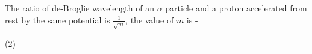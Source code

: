 \item The ratio of de-Broglie wavelength of an $\alpha$ particle and a proton accelerated from rest by the same potential is $\frac{1}{\sqrt{m}}$, the value of $m$ is -
    \begin{tasks}(2)
    \end{tasks}